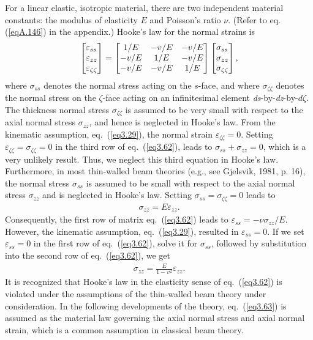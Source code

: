 \documentclass{AeroStructure-ERJohnson}
\begin{document}
For a linear elastic, isotropic material, there are two independent material constants: the modulus of elasticity $E$ and Poisson's ratio $\nu$. (Refer to eq. (\ref{eqA.146}) in the appendix.) Hooke's law for the normal strains is
\begin{align}\label{eq3.62}
\left[\begin{array}{@{}l@{}}
\varepsilon_{s s} \\
\varepsilon_{z z} \\
\varepsilon_{\zeta \zeta}
\end{array}\right]=\left[\begin{array}{@{}ccc@{}}1 / E & -v / E & -v / E \\-v / E & 1 / E & -v / E \\-v / E & -v / E & 1 / E\end{array}\right]\left[\begin{array}{@{}l@{}}\sigma_{s s} \\\sigma_{z z} \\\sigma_{\zeta \zeta}\end{array}\right],
\end{align}
where $\sigma_{ss}$ denotes the normal stress acting on the $s$-face, and where $\sigma_{\zeta \zeta}$ denotes the normal stress on the $\zeta$-face acting on an infinitesimal element \textit{ds}-by-\textit{dz}-by-$d\zeta$. The thickness normal stress $\sigma_{\zeta \zeta}$ is assumed to be very small with respect to the axial normal stress $\sigma_{z z}$, and hence is neglected in Hooke's law. From the kinematic assumption, eq.~(\ref{eq3.29}), the normal strain $\varepsilon_{\zeta \zeta}=0$. Setting $\varepsilon_{\zeta \zeta}=\sigma_{\zeta \zeta}=0$ in the third row of eq.~(\ref{eq3.62}), leads to $\sigma_{s s} +\sigma_{z z}=0$, which is a very unlikely result. Thus, we neglect this third equation in Hooke's law. Furthermore, in most thin-walled beam theories (e.g., see Gjelsvik, 1981, p. 16), the normal stress $\sigma_{ss}$ is assumed to be small with respect to the axial normal stress $\sigma_{z z}$ and is neglected in Hooke's law. Setting $\sigma_{ss}=\sigma_{\zeta \zeta}=0$ leads to
\begin{align}\label{eq3.63}
\sigma_{z z}=E \varepsilon_{z z}.
\end{align}
Consequently, the first row of matrix eq.~(\ref{eq3.62}) leads to $\varepsilon_{ss}=-\nu \sigma_{z z} / E$. However, the kinematic assumption, eq.~(\ref{eq3.29}), resulted in $\varepsilon_{s s}=0$. If we set $\varepsilon_{ss}=0$ in the first row of eq.~(\ref{eq3.62}), solve it for $\sigma_{ss}$, followed by substitution into the second row of eq.~(\ref{eq3.62}), we get
\begin{align}\label{eq3.64}
\sigma_{z z}=\frac{E}{1-v^{2}} \varepsilon_{z z}.
\end{align}
It is recognized that Hooke's law in the elasticity sense of eq.~(\ref{eq3.62}) is violated under the assumptions of the thin-walled beam theory under consideration. In the following developments of the theory, eq.~(\ref{eq3.63}) is assumed as the material law governing the axial normal stress and axial normal strain, which is a common assumption in classical beam theory.
\end{document}
